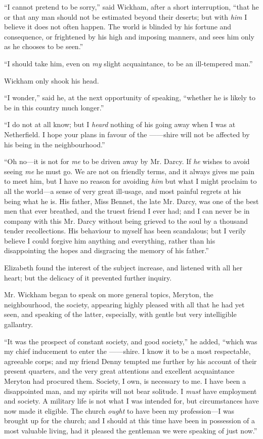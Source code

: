 \documentclass[12pt]{book}
\begin{document}
``I cannot pretend to be sorry,'' said Wickham, after a short interruption, ``that he or that any man should not be estimated beyond their deserts; but with \textit{him} I believe it does not often happen. The world is blinded by his fortune and consequence, or frightened by his high and imposing manners, and sees him only as he chooses to be seen.''

``I should take him, even on \textit{my} slight acquaintance, to be an ill-tempered man.''

Wickham only shook his head.

``I wonder,'' said he, at the next opportunity of speaking, ``whether he is likely to be in this country much longer.''

``I do not at all know; but I \textit{heard} nothing of his going away when I was at Netherfield. I hope your plans in favour of the ------shire will not be affected by his being in the neighbourhood.''

``Oh no---it is not for \textit{me} to be driven away by Mr. Darcy. If \textit{he} wishes to avoid seeing \textit{me} he must go. We are not on friendly terms, and it always gives me pain to meet him, but I have no reason for avoiding \textit{him} but what I might proclaim to all the world---a sense of very great ill-usage, and most painful regrets at his being what he is. His father, Miss Bennet, the late Mr. Darcy, was one of the best men that ever breathed, and the truest friend I ever had; and I can never be in company with this Mr. Darcy without being grieved to the soul by a thousand tender recollections. His behaviour to myself has been scandalous; but I verily believe I could forgive him anything and everything, rather than his disappointing the hopes and disgracing the memory of his father.''

Elizabeth found the interest of the subject increase, and listened with all her heart; but the delicacy of it prevented further inquiry.

Mr. Wickham began to speak on more general topics, Meryton, the neighbourhood, the society, appearing highly pleased with all that he had yet seen, and speaking of the latter, especially, with gentle but very intelligible gallantry.

``It was the prospect of constant society, and good society,'' he added, ``which was my chief inducement to enter the ------shire. I know it to be a most respectable, agreeable corps; and my friend Denny tempted me further by his account of their present quarters, and the very great attentions and excellent acquaintance Meryton had procured them. Society, I own, is necessary to me. I have been a disappointed man, and my spirits will not bear solitude. I \textit{must} have employment and society. A military life is not what I was intended for, but circumstances have now made it eligible. The church \textit{ought} to have been my profession---I was brought up for the church; and I should at this time have been in possession of a most valuable living, had it pleased the gentleman we were speaking of just now.''
\end{document}
